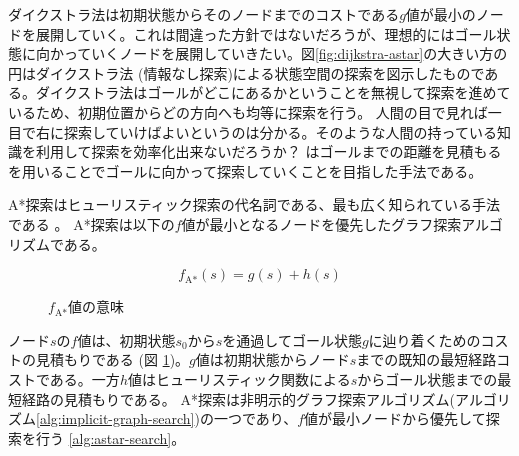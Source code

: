 ダイクストラ法は初期状態からそのノードまでのコストである$g$値が最小のノードを展開していく。これは間違った方針ではないだろうが、理想的にはゴール状態に向かっていくノードを展開していきたい。図\ref{fig:dijkstra-astar}の大きい方の円はダイクストラ法 (情報なし探索)による状態空間の探索を図示したものである。ダイクストラ法はゴールがどこにあるかということを無視して探索を進めているため、初期位置からどの方向へも均等に探索を行う。
人間の目で見れば一目で右に探索していけばよいというのは分かる。そのような人間の持っている知識を利用して探索を効率化出来ないだろうか？
はゴールまでの距離を見積もるを用いることでゴールに向かって探索していくことを目指した手法である。

A*探索はヒューリスティック探索の代名詞である、最も広く知られている手法である \cite{fikes:71}。
A*探索は以下の$f$値が最小となるノードを優先したグラフ探索アルゴリズムである。

\begin{equation}
  f_{\text{A*}}(s) = g(s) + h(s)
\label{alg:astar-search}
\end{equation}

\begin{figure}
  \centering
  \begin{tikzpicture}[scale=0.6]
    
  \end{tikzpicture}
  \caption{$f_{\text{A*}}$値の意味}
  \label{fig:fvalue}
\end{figure}


ノード$s$の$f$値は、初期状態$s_0$から$s$を通過してゴール状態$g$に辿り着くためのコストの見積もりである (図 \ref{fig:fvalue})。$g$値は初期状態からノード$s$までの既知の最短経路コストである。一方$h$値はヒューリスティック関数による$s$からゴール状態までの最短経路の見積もりである。
A*探索は非明示的グラフ探索アルゴリズム(アルゴリズム\ref{alg:implicit-graph-search})の一つであり、$f$値が最小ノードから優先して探索を行う \ref{alg:astar-search}。



